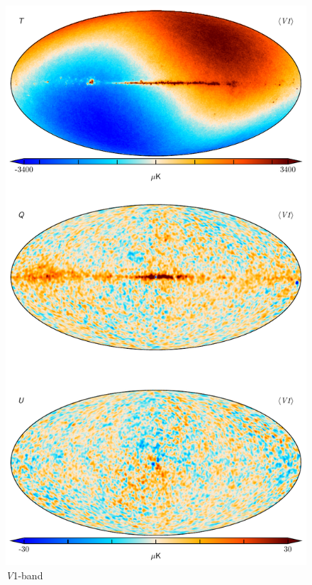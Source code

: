 \documentclass[twocolumn]{../../common/aa}
\newcommand{\V}[0]{\textit V}
\begin{document}
\begin{figure}
	\centering
	\includegraphics[height=0.9\textheight]{figures/060-WMAP_V1_map.pdf}
	\caption{\V1-band}
\end{figure}
\end{document}
